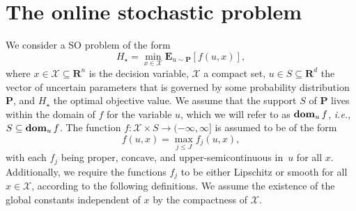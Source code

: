 \documentclass[12pt]{article}
\newcommand{\bnote}[1]{\textcolor{purple}{\textbf{[B: #1]}}}
\newcommand{\ie}{{\it i.e.}}
\newcommand{\prob}{{\mathbf P}}
\newcommand{\dom}{\mathop{\bf dom}_u} %
\newcommand{\supp}{S}
\newcommand{\unc}{u}
\newtheorem{definition}{Definition}[section]
\newcommand{\RC}[1]{\textcolor{black}{#1}}
\newcommand{\RC}[1]{\textcolor{blue}{#1}}
\begin{document}
\section{The online stochastic problem}
\label{sec:problem_intro}
We consider a \gls{SO} problem of the form
\begin{equation}
\label{eq:opt}
 H_\star  = \min_{x\in \mathcal{X}} \mathbf{E}_{\unc \sim \mathbf{P}}[f(\unc,x)],
\end{equation}
where $x \in \mathcal{X} \subseteq \mathbf{R}^n$ is the decision variable, $\mathcal{X}$ a compact set, $\unc \in \supp \subseteq \mathbf{R}^d$ the vector of uncertain parameters that is governed by some probability distribution $\mathbf{P}$, and $H_\star$ the optimal objective value. 
We assume that the support $\supp$ of $\prob$ lives within the domain of $f$ for the variable $u$, which we will refer to as $\dom{f}$, \ie, $\supp \subseteq \dom{f}$.
The function $f:\mathcal{X}\times \supp \rightarrow (-\infty, \infty]$ is assumed to be of the form 
$$f(u, x) = \max_{j\leq J}f_j(u,x),$$ 
with each $f_j$ being proper, concave, and upper-semicontinuous in~$u$ for all $x$.
Additionally, we require the functions $f_j$ to be either Lipschitz or smooth for all $x \in \mathcal{X}$, according to the following definitions. We assume the existence of the global constants independent of $x$ by the compactness of $\mathcal{X}$.
\end{document}
